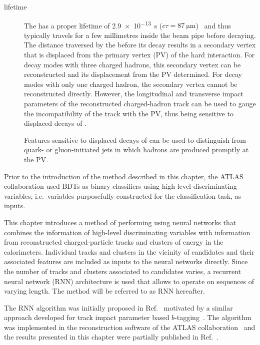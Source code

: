 \begin{description}
\item[\taulepton lifetime] The \taulepton has a proper lifetime of
  \SI{2.9e-13}{\second}
  ($c \tau = \SI{87}{\micro\metre}$)~\cite{pdg2020} and thus typically
  travels for a few millimetres inside the beam pipe before
  decaying. The distance traversed by the \taulepton before its decay
  results in a secondary vertex that is displaced from the primary
  vertex (PV) of the hard interaction. For \taulepton decay modes with
  three charged hadrons, this secondary vertex can be reconstructed
  and its displacement from the PV determined. For decay modes with
  only one charged hadron, the secondary vertex cannot be
  reconstructed directly. However, the longitudinal and transverse
  impact parameters of the reconstructed charged-hadron track can be
  used to gauge the incompatibility of the track with the PV, thus
  being sensitive to displaced decays of \tauleptons.

  Features sensitive to displaced decays of \tauleptons can be used to
  distinguish \tauhad from quark- or gluon-initiated jets in which
  hadrons are produced promptly at the PV.

\end{description}
Prior to the introduction of the method described in this chapter, the
ATLAS collaboration used BDTs as binary classifiers using high-level
discriminating variables, i.e.\ variables purposefully constructed for
the classification task, as inputs.

This chapter introduces a method of performing \tauid using neural
networks that combines the information of high-level discriminating
variables with information from reconstructed charged-particle tracks
and clusters of energy in the calorimeters. Individual tracks and
clusters in the vicinity of \tauhadvis candidates and their associated
features are included as inputs to the neural networks directly. Since
the number of tracks and clusters associated to \tauhadvis candidates
varies, a recurrent neural network (RNN) architecture is used that
allows to operate on sequences of varying length. The method will be
referred to as RNN \tauid hereafter.

The RNN \tauid algorithm was initially proposed in
Ref.~\cite{cdeutsch-master} motivated by a similar approach developed
for track impact parameter based
$b$-tagging~\cite{ATL-PHYS-PUB-2017-003}. The algorithm was
implemented in the reconstruction software of the ATLAS
collaboration~\cite{ATL-SOFT-PUB-2021-001} and the results presented
in this chapter were partially published in
Ref.~\cite{ATL-PHYS-PUB-2019-033}. %

